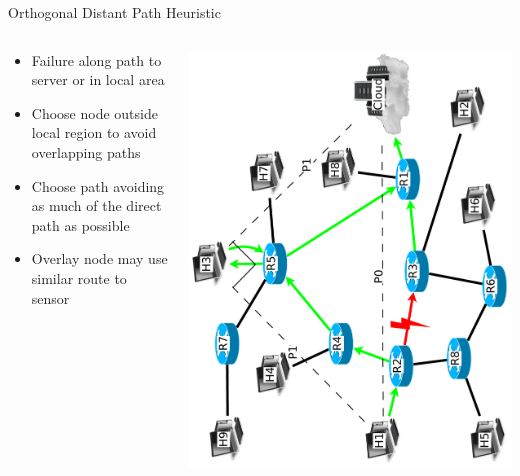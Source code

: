 \documentclass[pdftex]{beamer}
\begin{document}
\begin{frame}{Orthogonal Distant Path Heuristic}
\begin{columns}
\begin{column}{.5\textwidth}


\begin{itemize}
	\item Failure along path to server or in local area
	\item Choose node outside local	region to avoid overlapping	paths
	\item Choose path avoiding as much of the direct path as possible
	\item Overlay node may use similar route to sensor
\end{itemize}
\end{column}
	
\begin{column}{.5\textwidth}
\includegraphics[height=\textwidth,angle=-90]{angular_path}
\end{column}

\end{columns}
\end{frame}
\end{document}
